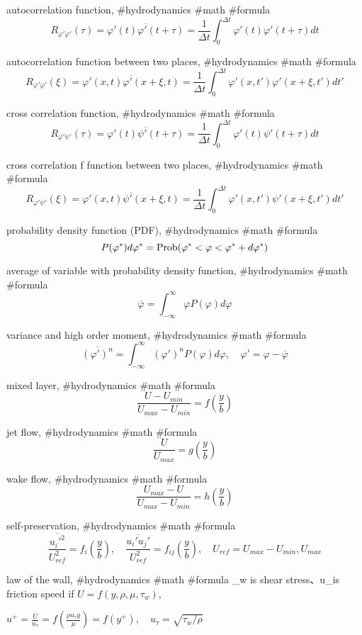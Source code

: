 autocorrelation function, #hydrodynamics #math #formula
$$
R_{\varphi'\varphi'}(\tau)=\overline{\varphi'(t)\varphi'(t+\tau)}=\frac{1}{\Delta t}\int^{\Delta t}_0 \varphi'(t)\varphi'(t+\tau) dt
$$

autocorrelation function between two places, #hydrodynamics #math #formula
$$
R_{\varphi'\varphi'}(\xi)=\overline{\varphi'(x,t)\varphi'(x+\xi,t)}=\frac{1}{\Delta t}\int^{\Delta t}_0 \varphi'(x,t')\varphi'(x+\xi,t') dt'
$$

cross correlation function, #hydrodynamics #math #formula
$$
R_{\varphi'\psi'}(\tau)=\overline{\varphi'(t)\psi'(t+\tau)}=\frac{1}{\Delta t}\int^{\Delta t}_0 \varphi'(t)\psi'(t+\tau) dt
$$

cross correlation f function between two places, #hydrodynamics #math #formula
$$
R_{\varphi'\psi'}(\xi)=\overline{\varphi'(x,t)\psi'(x+\xi,t)}=\frac{1}{\Delta t}\int^{\Delta t}_0 \varphi'(x,t')\psi'(x+\xi,t') dt'
$$

probability density function (PDF), #hydrodynamics #math #formula
$$
P(\varphi^*)d\varphi^*={\rm Prob}(\varphi^*<\varphi<\varphi^*+d\varphi^*)
$$

average of variable with probability density function, #hydrodynamics #math #formula
$$
\overline{\varphi}=\int^\infty_{-\infty} \varphi P(\varphi)d\varphi
$$

variance and high order moment, #hydrodynamics #math #formula
$$
\overline{(\varphi')^n}=\int^\infty_{-\infty} (\varphi')^n P(\varphi)d\varphi, \quad \varphi'=\varphi-\overline{\varphi}
$$

mixed layer, #hydrodynamics #math #formula
$$
\frac{U-U_{min}}{U_{max}-U_{min}}=f\left(\frac{y}{b}\right)
$$

jet flow, #hydrodynamics #math #formula
$$
\frac{U}{U_{max}}=g\left(\frac{y}{b}\right)
$$

wake flow, #hydrodynamics #math #formula
$$
\frac{U_{max}-U}{U_{max}-U_{min}}=h\left(\frac{y}{b}\right)
$$

self-preservation, #hydrodynamics #math #formula
$$
\frac{\overline{u_i'^2}}{U_{ref}^2}=f_i\left(\frac{y}{b}\right),\quad \frac{\overline{u_i'u_j'}}{U_{ref}^2}=f_{ij}\left(\frac{y}{b}\right), \quad U_{ref}=U_{max}-U_{min}, U_{max}
$$

law of the wall, #hydrodynamics #math #formula
\tau_w is shear stress、u_\tau is friction speed
if $U=f(y,\rho,\mu,\tau_w)$,

$u^+=\frac{U}{u_\tau}=f\left(\frac{\rho u_\tau y}{\mu}\right)=f(y^+),\quad u_\tau=\sqrt{\tau_w/\rho}$


